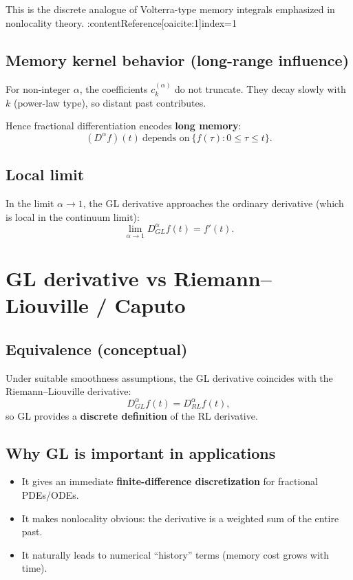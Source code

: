 This is the discrete analogue of Volterra-type memory integrals emphasized in nonlocality theory. :contentReference[oaicite:1]{index=1}

\subsection{Memory kernel behavior (long-range influence)}
For non-integer $\alpha$, the coefficients $c_k^{(\alpha)}$ do not truncate.
They decay slowly with $k$ (power-law type), so distant past contributes.

Hence fractional differentiation encodes \textbf{long memory}:
\begin{equation}
(D^\alpha f)(t)\ \text{depends on}\ \{f(\tau):0\le \tau\le t\}.
\end{equation}

\subsection{Local limit}
In the limit $\alpha\to 1$, the GL derivative approaches the ordinary derivative
(which is local in the continuum limit):
\begin{equation}
\lim_{\alpha\to 1}D_{GL}^\alpha f(t) = f'(t).
\end{equation}


\section{GL derivative vs Riemann--Liouville / Caputo}

\subsection{Equivalence (conceptual)}
Under suitable smoothness assumptions, the GL derivative coincides with the
Riemann--Liouville derivative:
\begin{equation}
D_{GL}^\alpha f(t) = D_{RL}^\alpha f(t),
\end{equation}
so GL provides a \textbf{discrete definition} of the RL derivative.

\subsection{Why GL is important in applications}
\begin{itemize}
\item It gives an immediate \textbf{finite-difference discretization} for fractional PDEs/ODEs.
\item It makes nonlocality obvious: the derivative is a weighted sum of the entire past.
\item It naturally leads to numerical ``history'' terms (memory cost grows with time).
\end{itemize}

